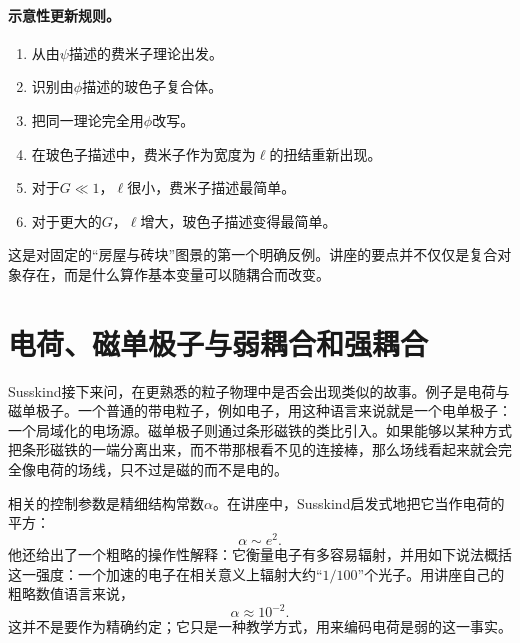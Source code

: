 \paragraph{示意性更新规则。}
\begin{enumerate}
\item 从由\(\psi\)描述的费米子理论出发。
\item 识别由\(\phi\)描述的玻色子复合体。
\item 把同一理论完全用\(\phi\)改写。
\item 在玻色子描述中，费米子作为宽度为\(\ell\)的扭结重新出现。
\item 对于\(G\ll 1\)，\(\ell\)很小，费米子描述最简单。
\item 对于更大的\(G\)，\(\ell\)增大，玻色子描述变得最简单。
\end{enumerate}

这是对固定的``房屋与砖块''图景的第一个明确反例。讲座的要点并不仅仅是复合对象存在，而是什么算作基本变量可以随耦合而改变。

\section{电荷、磁单极子与弱耦合和强耦合}

Susskind接下来问，在更熟悉的粒子物理中是否会出现类似的故事。例子是电荷与磁单极子。一个普通的带电粒子，例如电子，用这种语言来说就是一个电单极子：一个局域化的电场源。磁单极子则通过条形磁铁的类比引入。如果能够以某种方式把条形磁铁的一端分离出来，而不带那根看不见的连接棒，那么场线看起来就会完全像电荷的场线，只不过是磁的而不是电的。

相关的控制参数是精细结构常数\(\alpha\)。在讲座中，Susskind启发式地把它当作电荷的平方：
\begin{equation}
\alpha \sim e^2.
\end{equation}
他还给出了一个粗略的操作性解释：它衡量电子有多容易辐射，并用如下说法概括这一强度：一个加速的电子在相关意义上辐射大约``\(1/100\)''个光子。用讲座自己的粗略数值语言来说，
\begin{equation}
\alpha \approx 10^{-2}.
\end{equation}
这并不是要作为精确约定；它只是一种教学方式，用来编码电荷是弱的这一事实。


